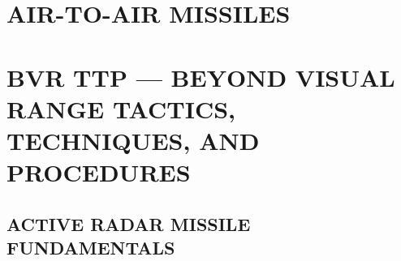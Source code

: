 \section{AIR-TO-AIR MISSILES}





\section[BVR TTP]{BVR TTP --- BEYOND VISUAL RANGE TACTICS, TECHNIQUES, \break AND PROCEDURES}
\label{subsec:bvr}

\subsection[AR FUNDAMENTALS]{ACTIVE RADAR MISSILE FUNDAMENTALS}


